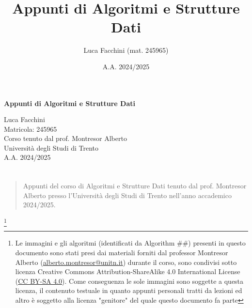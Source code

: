 \documentclass[twoside]{report}
\title{Appunti di Algoritmi e Strutture Dati}
\author{Luca Facchini (mat. 245965)}
\date{A.A. 2024/2025}
\makeatletter
\renewenvironment{abstract}{%
    \if@twocolumn
        \section*{\abstractname}%
    \else
        \begin{center}%
            {\bfseries \abstractname\vspace{-.5em}\vspace{\z@}}%
        \end{center}%
        \small
        \begin{quotation}
    \fi}
    {\if@twocolumn\else\end{quotation}\fi}
\theoremstyle{definition}
\makeatother
\begin{document}
    \begin{titlepage}
        \centering  %
        {\Huge\textbf{Appunti di Algoritmi e Strutture Dati}} \\[1cm] %
        \vspace{0.5cm}
        
        {\Large Luca Facchini} \\ %
        \vspace{0.3cm}
        {\large Matricola: 245965} \\[2cm] %
        
        {\large Corso tenuto dal prof. Montresor Alberto} \\[0.3cm] %
        {\large Università degli Studi di Trento} \\[1.5cm]
        
        {\large A.A. 2024/2025} \\[3cm] %
        
        \vfill
        \begin{abstract}
            Appunti del corso di Algoritmi e Strutture Dati tenuto dal prof. Montresor Alberto presso l'Università degli Studi di Trento nell'anno accademico 2024/2025.
        \end{abstract}
        \footnote{Le immagini e gli algoritmi (identificati da Algorithm \#\#) presenti in questo documento sono stati presi dai materiali forniti dal professor Montresor Alberto (\href{mailto:alberto.montresor@unitn.it}{alberto.montresor@unitn.it}) durante il corso, sono condivisi sotto licenza Creative Commons Attribution-ShareAlike 4.0 International License (\href{https://creativecommons.org/licenses/by-sa/4.0/}{CC BY-SA 4.0}). Come conseguenza le sole immagini sono soggette a questa licenza, il contenuto testuale in quanto appunti personali tratti da lezioni ed altro è soggetto alla licenza "genitore" del quale questo documento fa parte}
        
        \vfill  %
    \end{titlepage}
    \pagestyle{stdPage}
    \renewcommand{\headheight}{14.5pt}
    \begingroup
        \tableofcontents
        \thispagestyle{stdPage}
    \endgroup
    
    
    
    
    
    
\end{document}
